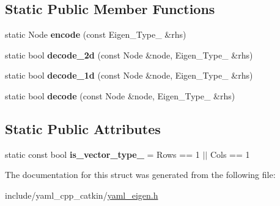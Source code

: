 \subsection*{Static Public Member Functions}
\begin{DoxyCompactItemize}
\item 
\mbox{\label{structYAML_1_1convert_3_01Eigen_1_1Matrix_3_01Scalar_00_01Rows_00_01Cols_00_01Align_00_01RowsAtC8665abb6da4eb6935869b0ee422ba9ce_ab1716b1cd1af6ef1bdb89dd867b05dc6}} 
static Node {\bfseries encode} (const Eigen\+\_\+\+Type\+\_\+ \&rhs)
\item 
\mbox{\label{structYAML_1_1convert_3_01Eigen_1_1Matrix_3_01Scalar_00_01Rows_00_01Cols_00_01Align_00_01RowsAtC8665abb6da4eb6935869b0ee422ba9ce_a27f60d49bf29a84c2d3e14a52e12df65}} 
static bool {\bfseries decode\+\_\+2d} (const Node \&node, Eigen\+\_\+\+Type\+\_\+ \&rhs)
\item 
\mbox{\label{structYAML_1_1convert_3_01Eigen_1_1Matrix_3_01Scalar_00_01Rows_00_01Cols_00_01Align_00_01RowsAtC8665abb6da4eb6935869b0ee422ba9ce_a596a49e214c2b493de23185ca5d7ff38}} 
static bool {\bfseries decode\+\_\+1d} (const Node \&node, Eigen\+\_\+\+Type\+\_\+ \&rhs)
\item 
\mbox{\label{structYAML_1_1convert_3_01Eigen_1_1Matrix_3_01Scalar_00_01Rows_00_01Cols_00_01Align_00_01RowsAtC8665abb6da4eb6935869b0ee422ba9ce_ab8738e33c1392218faf566a1e75395e4}} 
static bool {\bfseries decode} (const Node \&node, Eigen\+\_\+\+Type\+\_\+ \&rhs)
\end{DoxyCompactItemize}
\subsection*{Static Public Attributes}
\begin{DoxyCompactItemize}
\item 
\mbox{\label{structYAML_1_1convert_3_01Eigen_1_1Matrix_3_01Scalar_00_01Rows_00_01Cols_00_01Align_00_01RowsAtC8665abb6da4eb6935869b0ee422ba9ce_a02420fa6ad9be337bfcdbb83f7c292c3}} 
static const bool {\bfseries is\+\_\+vector\+\_\+type\+\_\+} = Rows == 1 $\vert$$\vert$ Cols == 1
\end{DoxyCompactItemize}


The documentation for this struct was generated from the following file\+:\begin{DoxyCompactItemize}
\item 
include/yaml\+\_\+cpp\+\_\+catkin/\hyperlink{yaml__eigen_8h}{yaml\+\_\+eigen.\+h}\end{DoxyCompactItemize}

